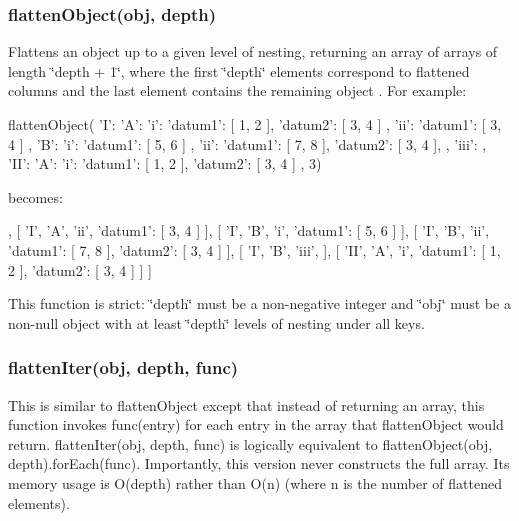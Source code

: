 \subsubsection*{flatten\+Object(obj, depth)}

Flattens an object up to a given level of nesting, returning an array of arrays of length \char`\"{}depth + 1\char`\"{}, where the first \char`\"{}depth\char`\"{} elements correspond to flattened columns and the last element contains the remaining object . For example\+: \begin{DoxyVerb}flattenObject({
    'I': {
        'A': {
            'i': {
                'datum1': [ 1, 2 ],
                'datum2': [ 3, 4 ]
            },
            'ii': {
                'datum1': [ 3, 4 ]
            }
        },
        'B': {
            'i': {
                'datum1': [ 5, 6 ]
            },
            'ii': {
                'datum1': [ 7, 8 ],
                'datum2': [ 3, 4 ],
            },
            'iii': {
            }
        }
    },
    'II': {
        'A': {
            'i': {
                'datum1': [ 1, 2 ],
                'datum2': [ 3, 4 ]
            }
        }
    }
}, 3)
\end{DoxyVerb}


becomes\+: \begin{DoxyVerb}[
    [ 'I',  'A', 'i',   { 'datum1': [ 1, 2 ], 'datum2': [ 3, 4 ] } ],
    [ 'I',  'A', 'ii',  { 'datum1': [ 3, 4 ] } ],
    [ 'I',  'B', 'i',   { 'datum1': [ 5, 6 ] } ],
    [ 'I',  'B', 'ii',  { 'datum1': [ 7, 8 ], 'datum2': [ 3, 4 ] } ],
    [ 'I',  'B', 'iii', {} ],
    [ 'II', 'A', 'i',   { 'datum1': [ 1, 2 ], 'datum2': [ 3, 4 ] } ]
]
\end{DoxyVerb}


This function is strict\+: \char`\"{}depth\char`\"{} must be a non-\/negative integer and \char`\"{}obj\char`\"{} must be a non-\/null object with at least \char`\"{}depth\char`\"{} levels of nesting under all keys.

\subsubsection*{flatten\+Iter(obj, depth, func)}

This is similar to {\ttfamily flatten\+Object} except that instead of returning an array, this function invokes {\ttfamily func(entry)} for each {\ttfamily entry} in the array that {\ttfamily flatten\+Object} would return. {\ttfamily flatten\+Iter(obj, depth, func)} is logically equivalent to {\ttfamily flatten\+Object(obj, depth).for\+Each(func)}. Importantly, this version never constructs the full array. Its memory usage is O(depth) rather than O(n) (where {\ttfamily n} is the number of flattened elements).

